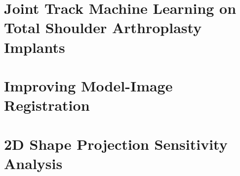 \section{Joint Track Machine Learning on Total Shoulder Arthroplasty Implants}

\section{Improving Model-Image Registration}

\section{2D Shape Projection Sensitivity Analysis}



